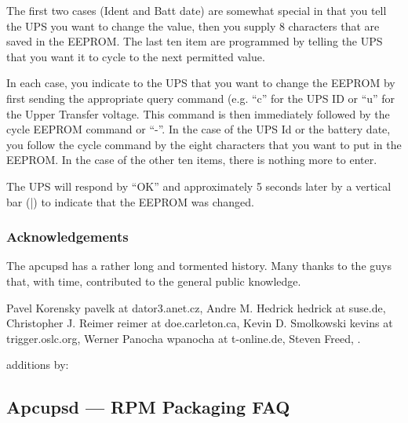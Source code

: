 {{{{{{{{{{{{{{{{{\begin{longtable}{lll}
\end{longtable}

The first two cases (Ident and Batt date) are somewhat special in that you
tell the UPS you want to change the value, then you supply 8 characters that
are saved in the EEPROM. The last ten item are programmed by telling the UPS
that you want it to cycle to the next permitted value.  

In each case, you indicate to the UPS that you want to change the EEPROM by
first sending the appropriate query command (e.g. ``c'' for the UPS ID or
``u'' for the Upper Transfer voltage. This command is then immediately
followed by the cycle EEPROM command or ``-''. In the case of the UPS Id or
the battery date, you follow the cycle command by the eight characters that
you want to put in the EEPROM. In the case of the other ten items, there is
nothing more to enter.  

The UPS will respond by ``OK'' and approximately 5 seconds later by a vertical
bar (|) to indicate that the EEPROM was changed. 

\label{Acknowledgements}

\subsubsection*{Acknowledgements}

The apcupsd has a rather long and tormented history. Many thanks to the guys
that, with time, contributed to the general public knowledge.  

Pavel Korensky \lt{}pavelk at dator3.anet.cz\gt{}, Andre M. Hedrick
\lt{}hedrick at suse.de\gt{}, Christopher J. Reimer \lt{}reimer at
doe.carleton.ca\gt{}, Kevin D. Smolkowski \lt{}kevins at
trigger.oslc.org\gt{}, Werner Panocha \lt{}wpanocha at t-online.de\gt{},
Steven Freed, 
.  

additions by: 

\label{Apcupsd-_002d_002d-RPM-Packaging-FAQ}

\subsection*{Apcupsd {---} RPM Packaging FAQ}

}}}}}}}}}}}}}}}}}
